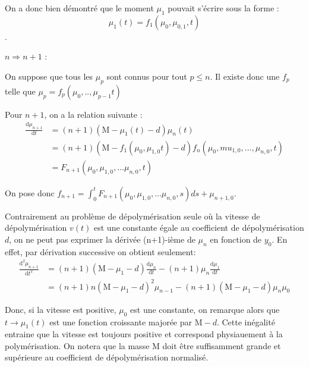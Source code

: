 \documentclass[a4paper]{article}
\newcommand{\mass}{\mathrm{M}}
\newcommand{\dep}{d}
\begin{document}
\begin{preuve}
	On a donc bien démontré que le moment $\mu_1$ pouvait s'écrire sous la forme :
	\[\mu_1(t) = f_1(\mu_0,\mu_{0,1},t)\].
	
	\vspace{0.5cm}
	
	\underline{$n 	\Rightarrow n+1$} :
	
	On suppose que tous les $\mu_p$ sont connus pour tout $p \leq n$. 
	Il existe donc une $f_p$ telle que $\mu_p = f_p(\mu_0,..,\mu_{p-1}t)$
	
	Pour $n+1$, on a la relation suivante :
	\[ 
	\begin{split}
	\frac{\mathrm{d} \mu_{n+1} }{\mathrm{d}t} &= (n+1)(\mass - \mu_1(t) - \dep)\mu_{n}(t) \\
	                                          &= (n+1)(\mass - f_1(\mu_0, \mu_{1,0}t) - \dep)f_{n}(\mu_0,mu_{1,0},...,\mu_{n,0},t) \\
	                                          &= F_{n+1}(\mu_0, \mu_{1,0},...\mu_{n,0}, t)
	\end{split}									
	\]
	
	On pose donc $f_{n+1} = \int_0^t F_{n+1}(\mu_0, \mu_{1,0},...\mu_{n,0}, s)ds + \mu_{n+1,0}$.
	
\end{preuve}


\begin{remarque}
Contrairement au problème de dépolymérisation seule où la vitesse de dépolymérisation $v(t)$
est une constante égale au coefficient de dépolymérisation $\dep$, 
on ne peut pas exprimer la dérivée (n+1)-ième de $\mu_n$ en fonction de $y_0$.
En effet, par dérivation successive on obtient seulement:
	\[ 
	\begin{split}
	\frac{\mathrm{d}^2 \mu_{n+1} }{\mathrm{d}t^2} &=  (n+1) (\mass - \mu_1 - \dep) \frac{\mathrm{d} \mu_{n} }{\mathrm{d}t}  
	                                                 - (n+1) \mu_n \frac{\mathrm{d} \mu_{1} }{\mathrm{d}t} \\
												  &= (n+1)n (\mass - \mu_1 - \dep)^2 \mu_{n-1} - (n+1)(\mass - \mu_1 - \dep)\mu_n\mu_0 
	\end{split}
	\]
\end{remarque}

Donc, si la vitesse est positive, $\mu_0$ est une constante,
on remarque alors que $t \to \mu_1(t)$ est une fonction croissante majorée par $\mass-\dep$. 
Cette inégalité entraine que la vitesse est toujours positive et correspond physiauement à la polymérisation.
On notera que la masse $\mass$ doit être suffisamment grande et supérieure au coefficient de dépolymérisation normalisé.
\end{document}
